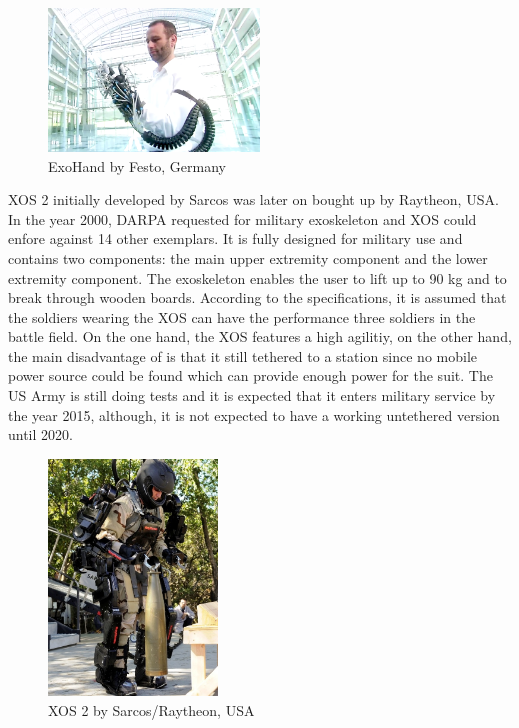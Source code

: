 \documentclass[letterpaper, 10 pt, conference]{ieeeconf}  %
\begin{document}

\begin{figure}[H]
  \centering
    \includegraphics[width=0.5\textwidth]{img/exohand}
  \caption{ExoHand by Festo, Germany}
\end{figure}


XOS 2 initially developed by Sarcos was later on bought up by Raytheon, USA. In the year 2000, DARPA requested for
military exoskeleton and XOS could enfore against 14 other exemplars. It is fully designed for military use and
contains two components: the main upper extremity component and the lower extremity component. The exoskeleton
enables the user to lift up to 90 kg and to break through wooden boards. According to the specifications, it is assumed
that the soldiers wearing the XOS can have the performance three soldiers in the battle field. On the one hand, the XOS
features a high agilitiy, on the other hand, the main disadvantage of is that it still tethered to a station
since no mobile power source could be found which can provide enough power for the suit. The US Army is still
doing tests and it is expected that it enters military service by the year 2015, although, it is not expected
to have a working untethered version until 2020.

\newpage

\begin{figure}[H]
  \centering
    \includegraphics[width=0.4\textwidth]{img/xos2}
  \caption{XOS 2 by Sarcos/Raytheon, USA}
\end{figure}
\end{document}
